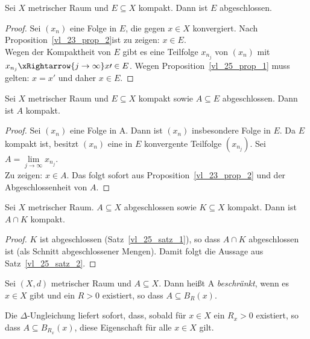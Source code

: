 \begin{Satz}\label{vl_25_satz_1} %
	Sei $X$ metrischer Raum und $E \subseteq X$ kompakt. Dann ist $E$ abgeschlossen. 
\end{Satz}

\begin{proof}
	Sei $(x_n)$ eine Folge in $E$, die gegen $x \in X$ konvergiert. Nach 
	Proposition~\ref{vl_23_prop_2}ist zu zeigen: $x \in E$. \\
	Wegen der Kompaktheit von $E$ gibt es eine Teilfolge $x_{n_j}$ von $(x_n)$ 
	mit $x_{n_j} \xRightarrow{j \rightarrow \infty} x\prime \in E$. Wegen 
	Proposition~\ref{vl_25_prop_1} muss gelten: $x = x\prime$ und daher $x \in E$. 
\end{proof}

\begin{Satz}\label{vl_25_satz_2}%
	Sei $X$ metrischer Raum und $E \subseteq X$ kompakt sowie $A \subseteq E$ 
	abgeschlossen. Dann ist $A$ kompakt.
\end{Satz}

\begin{proof}
	Sei $(x_n)$ eine Folge in A. Dann ist $(x_n)$ insbesondere Folge in $E$. 
	Da $E$ kompakt ist, besitzt $(x_n)$ eine in $E$ konvergente 
	Teilfolge $(x_{n_j})$. Sei $A = \lim\limits_{j \rightarrow \infty}{x_{n_j}}$.\\
	Zu zeigen: $x \in A$. Das folgt sofort aus Proposition~\ref{vl_23_prop_2} 
	und der Abgeschlossenheit 
	von $A$.
\end{proof}

\begin{Korollar}%
	Sei $X$ metrischer Raum. $A \subseteq X$ abgeschlossen sowie $K \subseteq X$ 
	kompakt. Dann ist $A \cap K$ kompakt.
\end{Korollar}

\begin{proof}
	$K$ ist abgeschlossen (Satz~\ref{vl_25_satz_1}), so dass $A \cap K$ 
	abgeschlossen ist (als Schnitt abgeschlossener Mengen). Damit folgt die 
	Aussage aus Satz~\ref{vl_25_satz_2}.
\end{proof}

\begin{Definition}%
	Sei $(X,d)$ metrischer Raum und $A \subseteq X$. Dann heißt A \emph{beschränkt}, 
	wenn es $x \in X$ gibt und ein $R> 0$ existiert, so dass $A \subseteq B_R(x)$.
\end{Definition}

\begin{Bemerkung}
	Die $\Delta$-Ungleichung liefert sofort, dass, sobald für $x \in X$ ein $R_x >0$ 
	existiert, so dass $A\subseteq B_{R_x}(x)$, diese Eigenschaft für alle 
	$x\in X$ gilt.
\end{Bemerkung}

